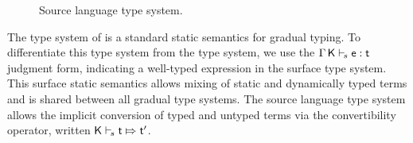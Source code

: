 \documentclass[USenglish]{tex/lipics-v2016}
\begin{document}
\begin{figure}[!h]
\begin{mathpar}



          \end{mathpar}
  
  \vspace{2mm}
  
  
  \begin{mathpar}
    
    
  \end{mathpar}

  \hrulefill
  \caption{Source language type system.}\label{fig:slts}
\end{figure}

The type system of  is a standard static semantics for
gradual typing. To differentiate this type system from the \kafka type
system, we use the $\EnvTypeS \Env\K\e\t$ judgment form, indicating a
well-typed expression in the surface type system. This surface static
semantics allows mixing of static and dynamically typed terms and is shared
between all gradual type systems. The source language type system allows the
implicit conversion of typed and untyped terms via the convertibility
operator, written $\ConvertE\K{s}{\t}{\tp}$.
\end{document}
